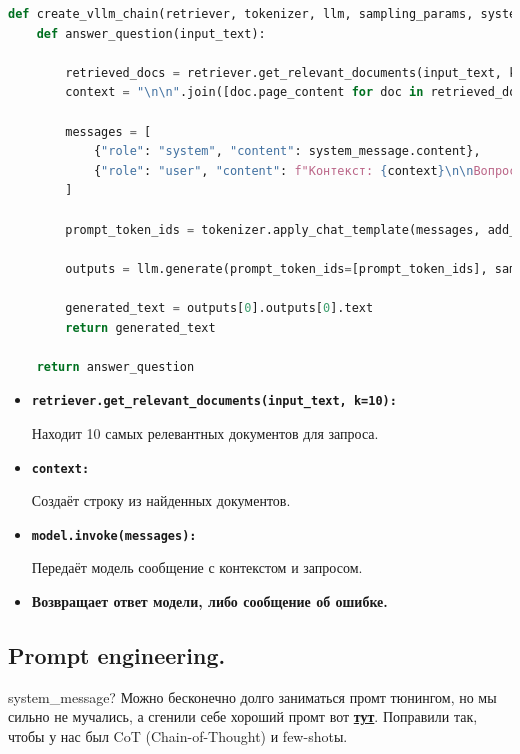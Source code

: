 \documentclass{article}
\begin{document}
\begin{lstlisting}[language=Python, label=code:example]
def create_vllm_chain(retriever, tokenizer, llm, sampling_params, system_message):
    def answer_question(input_text):
        
        retrieved_docs = retriever.get_relevant_documents(input_text, k=10)
        context = "\n\n".join([doc.page_content for doc in retrieved_docs])
        
        messages = [
            {"role": "system", "content": system_message.content},
            {"role": "user", "content": f"Контекст: {context}\n\nВопрос: {input_text}"}
        ]
        
        prompt_token_ids = tokenizer.apply_chat_template(messages, add_generation_prompt=True)
        
        outputs = llm.generate(prompt_token_ids=[prompt_token_ids], sampling_params=sampling_params)
        
        generated_text = outputs[0].outputs[0].text
        return generated_text
    
    return answer_question
\end{lstlisting}


\begin{itemize}
    \item \textbf{\texttt{retriever.get\_relevant\_documents(input\_text, k=10):}}
    
    Находит 10 самых релевантных документов для запроса.
    \item \textbf{\texttt{context:}}
    
    Создаёт строку из найденных документов.
    \item \textbf{\texttt{model.invoke(messages):}}
    
    Передаёт модель сообщение с контекстом и запросом.
    \item \textbf{Возвращает ответ модели, либо сообщение об ошибке.}
\end{itemize}

\subsection*{Prompt engineering.}

system\_message? Можно бесконечно долго заниматься промт тюнингом, но мы сильно не мучались, а сгенили себе хороший промт вот \textbf{\href{https://chatgpt.com/g/g-8qIKJ1ORT-system-prompt-generator}{тут}}. Поправили так, чтобы у нас был CoT (Chain-of-Thought) и few-shotы.
\end{document}
